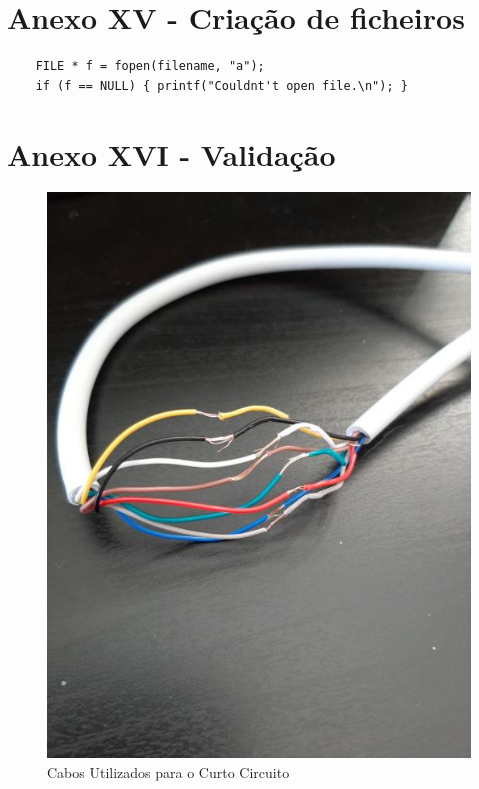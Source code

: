 \documentclass[article, a4paper, 11pt, oneside]{memoir}
\begin{document}
\section{Anexo XV - Criação de ficheiros}
\begin{lstlisting}
    FILE * f = fopen(filename, "a");
    if (f == NULL) { printf("Couldnt't open file.\n"); }
\end{lstlisting}

\section{Anexo XVI - Validação}

\begin{figure}[htbp]
  \centering        
  \includegraphics[scale=0.2]{img/cable.jpg}
  \caption{Cabos Utilizados para o Curto Circuito}
\end{figure}

\newpage
\end{document}
